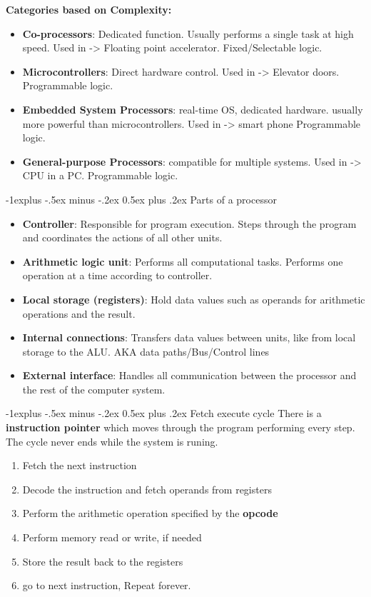 \documentclass[letterpaper, 8pt]{extarticle}
\makeatletter
\renewcommand{\subsection}{\@startsection{subsection}{2}{0mm}%
                                {-1explus -.5ex minus -.2ex}%
                                {0.5ex plus .2ex}%
                                {\normalfont\small\bfseries}}
\makeatother
\begin{document}
\begin{multicols*}{6}
	\textbf{Categories based on Complexity:} \\
	\begin{itemize}
		\item \textbf{Co-processors}: Dedicated function. Usually performs a single task at high speed. Used in -> Floating point accelerator. Fixed/Selectable logic.
		\item \textbf{Microcontrollers}: Direct hardware control. Used in -> Elevator doors. Programmable logic.
		\item \textbf{Embedded System Processors}: real-time OS, dedicated hardware. usually more powerful than microcontrollers. Used in -> smart phone Programmable logic.
		\item \textbf{General-purpose Processors}: compatible for multiple systems. Used in -> CPU in a PC. Programmable logic.
	\end{itemize}

	\subsection{Parts of a processor}
	\begin{itemize}
		\item \textbf{Controller}: Responsible for program execution. Steps through the program and coordinates the actions of all other units.
		\item \textbf{Arithmetic logic unit}: Performs all computational tasks. Performs one operation at a time according to controller.
		\item \textbf{Local storage (registers)}: Hold data values such as operands for arithmetic operations and the result.
		\item \textbf{Internal connections}: Transfers data values between units, like from local storage to the ALU. AKA data paths/Bus/Control lines
		\item \textbf{External interface}: Handles all communication between the processor and the rest of the computer system.
	\end{itemize}

	\subsection{Fetch execute cycle}
	There is a \textbf{instruction pointer} which moves through the program performing every step. The cycle never ends while the system is runing.
	\begin{enumerate}
		\item Fetch the next instruction
		\item Decode the instruction and fetch operands from registers
		\item Perform the arithmetic operation specified by the \textbf{opcode}
		\item Perform memory read or write, if needed
		\item Store the result back to the registers
		\item go to next instruction, Repeat forever.
	\end{enumerate}


\end{multicols*}
\end{document}
